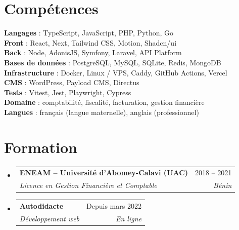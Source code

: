 \documentclass[a4paper,11pt]{article}
\makeatletter
\newlength{\entrygap}
\newlength{\headgap}
\newcommand{\resumeSubheading}[4]{
    \vspace{\entrygap}\item
    \begin{tabular*}{0.97\textwidth}[t]{l@{\extracolsep{\fill}}r}
        \textbf{#1} & #2 \\
        \textit{\small#3} & \textit{\small #4} \\
    \end{tabular*}\vspace{\headgap}
}
\newcommand{\resumeSubHeadingListStart}{\begin{itemize}[leftmargin=0.15in, label={}]}
\newcommand{\resumeSubHeadingListEnd}{\end{itemize}}
\makeatother
\begin{document}
\section{Compétences}
\begin{itemize}[leftmargin=0.15in, label={}]
    \small{\item{
        \textbf{Langages}{ : TypeScript, JavaScript, PHP, Python, Go} \\
        \textbf{Front}{ : React, Next, Tailwind CSS, Motion, Shadcn/ui} \\
        \textbf{Back}{ : Node, AdonisJS, Symfony, Laravel, API Platform} \\
        \textbf{Bases de données}{ : PostgreSQL, MySQL, SQLite, Redis, MongoDB} \\
        \textbf{Infrastructure}{ : Docker, Linux / VPS, Caddy, GitHub Actions, Vercel} \\
        \textbf{CMS}{ : WordPress, Payload CMS, Directus} \\
        \textbf{Tests}{ : Vitest, Jest, Playwright, Cypress} \\
        \textbf{Domaine}{ : comptabilité, fiscalité, facturation, gestion financière} \\
        \textbf{Langues}{ : français (langue maternelle), anglais (professionnel)}
    }}
\end{itemize}

\section{Formation}
\resumeSubHeadingListStart
    \resumeSubheading
        {ENEAM -- Université d'Abomey-Calavi (UAC)}{2018 -- 2021}
        {Licence en Gestion Financière et Comptable}{Bénin}
    \resumeSubheading
        {Autodidacte}{Depuis mars 2022}
        {Développement web}{En ligne}
\resumeSubHeadingListEnd

\end{document}
